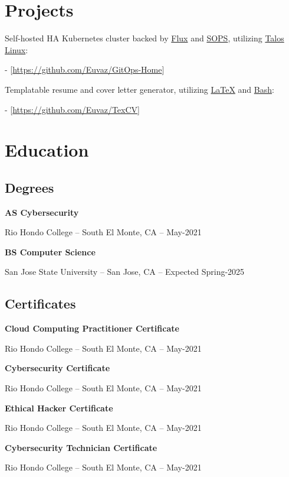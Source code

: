 \documentclass[a4paper]{article}
\begin{document}
\section{Projects}
Self-hosted HA Kubernetes cluster backed by \href{https://toolkit.fluxcd.io}{Flux} and \href{https://toolkit.fluxcd.io/guides/mozilla-sops}{SOPS}, utilizing \href{https://www.talos.dev/}{Talos Linux}:\par
- [\url{https://github.com/Euvaz/GitOps-Home}]

\medskip
Templatable resume and cover letter generator, utilizing \href{https://www.latex-project.org/}{LaTeX} and \href{https://www.gnu.org/software/bash/}{Bash}:\par
- [\url{https://github.com/Euvaz/TexCV}]

\section{Education}
\subsection{Degrees}
\begin{minipage}{\textwidth}
\textbf{AS Cybersecurity}\par
Rio Hondo College -- South El Monte, CA -- May-2021

\medskip
\textbf{BS Computer Science}\par
San Jose State University -- San Jose, CA -- Expected Spring-2025
\end{minipage}

\vspace{20pt}
\subsection{Certificates}
\begin{minipage}{\textwidth}
\textbf{Cloud Computing Practitioner Certificate}\par
Rio Hondo College -- South El Monte, CA -- May-2021

\medskip
\textbf{Cybersecurity Certificate}\par
Rio Hondo College -- South El Monte, CA -- May-2021

\medskip
\textbf{Ethical Hacker Certificate}\par
Rio Hondo College -- South El Monte, CA -- May-2021

\medskip
\textbf{Cybersecurity Technician Certificate}\par
Rio Hondo College -- South El Monte, CA -- May-2021
\end{minipage}
\end{document}
